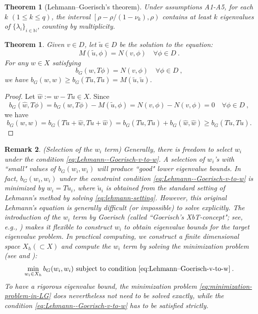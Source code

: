 \documentclass[a4,11pt]{article}
\numberwithin{equation}{section}
\newtheorem{theorem}{Theorem}[section]
\newtheorem{remark}[theorem]{Remark}
\newtheorem{lemma}{Theorem}[section]
\begin{document}
\begin{theorem}[Lehmann--Goerisch's theorem] 
\label{thm:Lehmann--Goerisch}
Under {assumptions A1-A5}, for  each $k$ $(1\le k \le q)$, 
the interval $\left[\rho -\rho/(1-\nu_k),\rho\right)$ contains at least $k$ eigenvalues of  
   $\{\lambda_i\}_{i\in \mathbb{N}}$, counting by multiplicity.
\end{theorem}




\begin{lemma}
\label{lem:Lehmann}
Given $v \in D$, let  $\tilde{u}  \in D$ be the solution to the equation: 
\begin{equation}
	\label{eq:lehmann-setting}
 M(\tilde{u}, \phi)=N(v,\phi)\quad \forall \phi  \in D ~.
\end{equation}
For any $w \in X$  satisfying
\begin{equation*}
b_G(w, T \phi )=N(v,\phi)\quad \forall \phi  \in D ~,
\end{equation*}
we have $b_G(w, w) \ge b_G(T\tilde{u}, T\tilde{u})=M(\tilde{u}, \tilde{u})$.
\end{lemma}
\begin{proof}
Let $\widehat{w}:=w-T\tilde{u} \in X$.  Since  
$$
b_G(\widehat{w}, T \phi )=
 b_G(w, T \phi ) - M(\tilde{u}, \phi) = N(v,\phi)-N(v,\phi)=0 \quad \forall \phi  \in D\:,$$ 
we have
$$
b_G(w, w)= b_G(T\tilde{u}+\widehat{w}, T\tilde{u}+\widehat{w})
=b_G(T\tilde{u}, T\tilde{u} )+ b_G(\widehat{w}, \widehat{w}) \ge b_G(T\tilde{u}, T\tilde{u}).
$$

\end{proof}
\begin{remark}
{(Selection of the $w_i$ term)}
\label{remark:selection_of_w_i}
Generally, there is freedom to select $w_i$ under the condition \eqref{eq:Lehmann--Goerisch-v-to-w}. A selection of $w_i$'s with  ``small" values of $b_G(w_i,w_i)$ will produce ``good" lower eigenvalue bounds. 
In fact, $b_G(w_i,w_i)$ under the constraint condition \eqref{eq:Lehmann--Goerisch-v-to-w} is minimized by $w_i = T \widetilde{u}_i$, where $\widetilde{u}_i$ is obtained from the standard setting of Lehmann's method by solving \eqref{eq:lehmann-setting}.
However, this original Lehmann's equation is generally difficult (or impossible)  to solve explicitly.
The introduction of the $w_i$ term  by Goerisch (called ``Goerisch's XbT-concept"; see, e.g., \cite[Lemma 10.25]{nakao2019numerical_book})  makes it flexible to construct $w_i$ to obtain eigenvalue bounds for the target eigenvalue problem. In practical computing, we construct a finite dimensional space $X_h(\subset X)$ and compute the $w_i$ term by solving the minimization problem (see  \cite[Remark 5]{liu-2013-2} and  \cite[Remark 10.26 (c)]{nakao2019numerical_book}):
\begin{equation}
\label{eq:minimization-problem-in-LG}
	\min_{w_i \in X_h} b_G(w_i, w_i) \text{ subject to condition \eqref{eq:Lehmann--Goerisch-v-to-w}}\:.  
\end{equation}
To have a rigorous eigenvalue bound, the  minimization problem \cref{eq:minimization-problem-in-LG}	 does nevertheless not need to be solved exactly, while the condition \eqref{eq:Lehmann--Goerisch-v-to-w} has to be satisfied strictly.
\end{remark}
%
\end{document}
